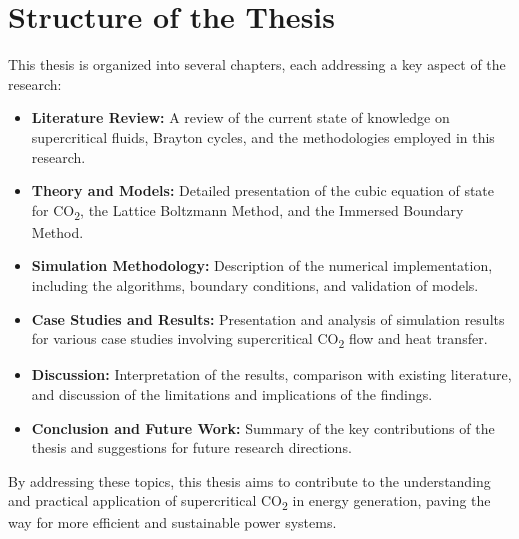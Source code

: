 \section*{Structure of the Thesis}
This thesis is organized into several chapters, each addressing a key aspect of the research:

\begin{itemize}
    \item \textbf{Literature Review:} A review of the current state of knowledge on supercritical fluids, Brayton cycles, and the methodologies employed in this research.
    \item \textbf{Theory and Models:} Detailed presentation of the cubic equation of state for CO\textsubscript{2}, the Lattice Boltzmann Method, and the Immersed Boundary Method.
    \item \textbf{Simulation Methodology:} Description of the numerical implementation, including the algorithms, boundary conditions, and validation of models.
    \item \textbf{Case Studies and Results:} Presentation and analysis of simulation results for various case studies involving supercritical CO\textsubscript{2} flow and heat transfer.
    \item \textbf{Discussion:} Interpretation of the results, comparison with existing literature, and discussion of the limitations and implications of the findings.
    \item \textbf{Conclusion and Future Work:} Summary of the key contributions of the thesis and suggestions for future research directions.
\end{itemize}

By addressing these topics, this thesis aims to contribute to the understanding and practical application of supercritical CO\textsubscript{2} in energy generation, paving the way for more 
efficient and sustainable power systems.
